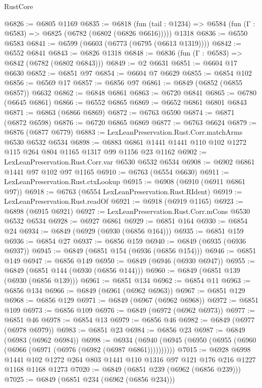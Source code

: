 \begin{lexlean}{RustCore}
\begin{coremodule}
@6826 := @6805 @1169
@6835 := @6818
    (fun (tail : @1234) => @6584 (fun (Γ : @6583) => @6825 (@6782 (@6802 (@6826 @6616)))))
    @1318
@6836 := @6550 @6583
@6841 := @6599 (@6603 (@6773 (@6795 (@6613 @1319))))
@6842 := @6552 @6841
@6843 := @6826 @1318
@6848 := @6836 (fun (Γ : @6583) => @6842 (@6782 (@6802 @6843)))
@6849 := @2 @6631
@6851 := @6604 @17 @6630
@6852 := @6851 @97
@6854 := @6604 @7 @6629
@6855 := @6854 @102
@6856 := @6569 @17
@6857 := @6856 @97
@6861 := @6849 (@6852 (@6855 @6857)) @6632
@6862 := @6848 @6861
@6863 := @6720 @6841
@6865 := @6780 (@6645 @6861)
@6866 := @6552 @6865
@6869 := @6652 @6861 @6801 @6843
@6871 := @6863 (@6866 @6869)
@6872 := @6763 @6590
@6874 := @6871 (@6872 @6598)
@6876 := @6720 @6865 @6869
@6877 := @6763 @6624
@6879 := @6876 (@6877 @6779)
@6883 := LexLeanPreservation.Rust.Corr.matchArms @6530 @6532 @6534
@6898 := @6883 @6861 @1441 @1441 @110 @102 @1272 @115 @264 @804 @1165 @1317 @99 @1156 @23 @1162
@6902 := LexLeanPreservation.Rust.Corr.var @6530 @6532 @6534
@6908 := @6902 @6861 @1441 @97 @102 @97 @1165
@6910 := @6763 (@6554 @6630)
@6911 := LexLeanPreservation.Rust.ctxLookup
@6915 := @6908 (@6910 (@6911 @6861 @97))
@6918 := @6763 (@6554 LexLeanPreservation.Rust.RIdent)
@6919 := LexLeanPreservation.Rust.readOf
@6921 := @6918 (@6919 @1165)
@6923 := @6898 (@6915 @6921)
@6927 := LexLeanPreservation.Rust.Corr.mCons @6530 @6532 @6534
@6928 := @6927 @6861
@6929 := @6851 @164
@6930 := @6854 @24
@6934 := @6849 (@6929 (@6930 (@6856 @164)))
@6935 := @6851 @159
@6936 := @6854 @27
@6937 := @6856 @159
@6940 := @6849 (@6935 (@6936 @6937))
@6945 := @6849 (@6851 @154 (@6936 (@6856 @154)))
@6946 := @6851 @149
@6947 := @6856 @149
@6950 := @6849 (@6946 (@6930 @6947))
@6955 := @6849 (@6851 @144 (@6930 (@6856 @144)))
@6960 := @6849 (@6851 @139 (@6930 (@6856 @139)))
@6961 := @6851 @134
@6962 := @6854 @11
@6963 := @6856 @134
@6966 := @6849 (@6961 (@6962 @6963))
@6967 := @6851 @129
@6968 := @6856 @129
@6971 := @6849 (@6967 (@6962 @6968))
@6972 := @6851 @109
@6973 := @6856 @109
@6976 := @6849 (@6972 (@6962 @6973))
@6977 := @6851 @46
@6978 := @6854 @13
@6979 := @6856 @46
@6982 := @6849 (@6977 (@6978 @6979))
@6983 := @6851 @23
@6984 := @6856 @23
@6987 := @6849 (@6983 (@6962 @6984))
@6998 := @6934 (@6940 (@6945 (@6950 (@6955 (@6960 (@6966 (@6971 (@6976 (@6982 (@6987 @6861))))))))))
@7015 := @6928
    @6998
    @1441
    @102
    @1272
    @264
    @803
    @1441
    @110
    @1316
    @97
    @121
    @176
    @216
    @1227
    @1168
    @1168
    @1273
@7020 := @6849 (@6851 @239 (@6962 (@6856 @239)))
@7025 := @6849 (@6851 @234 (@6962 (@6856 @234)))

\end{coremodule}
\end{lexlean}

